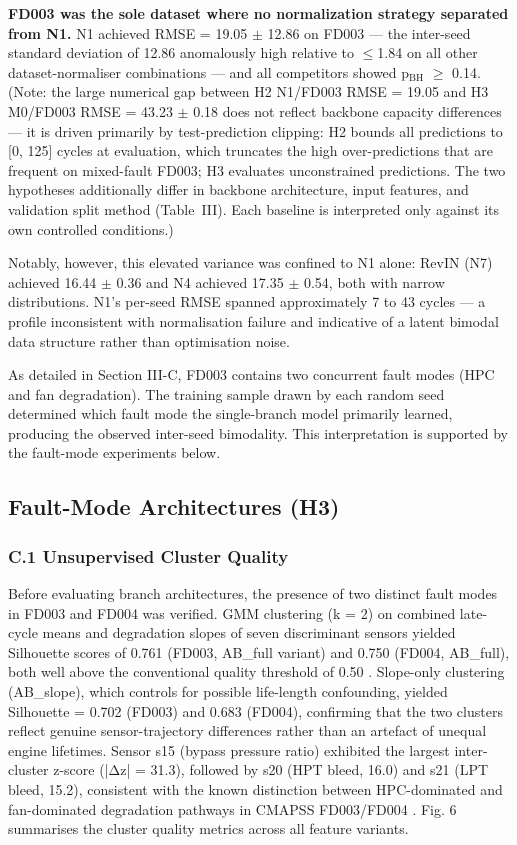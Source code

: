 \documentclass[review,12pt]{elsarticle}
\begin{document}
\textbf{FD003 was the sole dataset where no normalization strategy separated from N1.} N1 achieved RMSE = 19.05 $\pm$ 12.86 on FD003 --- the inter-seed standard deviation of 12.86 anomalously high relative to $\leq$1.84 on all other dataset-normaliser combinations --- and all competitors showed p$_\text{BH}$ $\geq$ 0.14. (Note: the large numerical gap between H2 N1/FD003 RMSE = 19.05 and H3 M0/FD003 RMSE = 43.23 $\pm$ 0.18 does not reflect backbone capacity differences --- it is driven primarily by test-prediction clipping: H2 bounds all predictions to [0, 125] cycles at evaluation, which truncates the high over-predictions that are frequent on mixed-fault FD003; H3 evaluates unconstrained predictions. The two hypotheses additionally differ in backbone architecture, input features, and validation split method (Table~III). Each baseline is interpreted only against its own controlled conditions.)

Notably, however, this elevated variance was confined to N1 alone: RevIN (N7) achieved 16.44 $\pm$ 0.36 and N4 achieved 17.35 $\pm$ 0.54, both with narrow distributions. N1's per-seed RMSE spanned approximately 7 to 43 cycles --- a profile inconsistent with normalisation failure and indicative of a latent bimodal data structure rather than optimisation noise.

As detailed in Section III-C, FD003 contains two concurrent fault modes (HPC and fan degradation). The training sample drawn by each random seed determined which fault mode the single-branch model primarily learned, producing the observed inter-seed bimodality. This interpretation is supported by the fault-mode experiments below.

\subsection{Fault-Mode Architectures (H3)}

\subsubsection{C.1 Unsupervised Cluster Quality}

Before evaluating branch architectures, the presence of two distinct fault modes in FD003 and FD004 was verified. GMM clustering (k = 2) on combined late-cycle means and degradation slopes of seven discriminant sensors yielded Silhouette scores of 0.761 (FD003, AB_full variant) and 0.750 (FD004, AB_full), both well above the conventional quality threshold of 0.50 \cite{ref35}. Slope-only clustering (AB_slope), which controls for possible life-length confounding, yielded Silhouette = 0.702 (FD003) and 0.683 (FD004), confirming that the two clusters reflect genuine sensor-trajectory differences rather than an artefact of unequal engine lifetimes. Sensor s15 (bypass pressure ratio) exhibited the largest inter-cluster z-score (|Δz| = 31.3), followed by s20 (HPT bleed, 16.0) and s21 (LPT bleed, 15.2), consistent with the known distinction between HPC-dominated and fan-dominated degradation pathways in CMAPSS FD003/FD004 \cite{ref36}. Fig. 6 summarises the cluster quality metrics across all feature variants.
\end{document}
